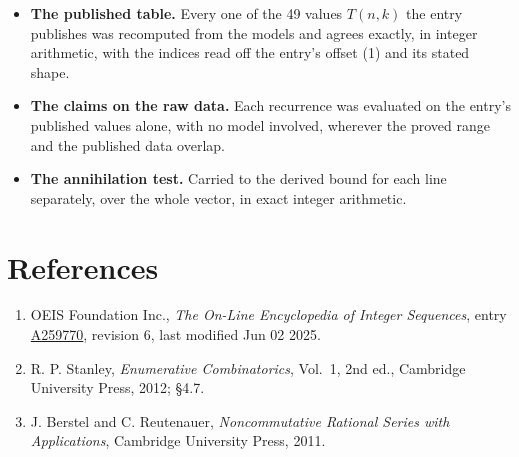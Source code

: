 \documentclass[11pt]{article}
\theoremstyle{definition}
\begin{document}
\begin{itemize}

\item {\bfseries The published table.} Every one of the 49 values $T(n,k)$ the entry publishes was recomputed from the models and agrees exactly, in integer arithmetic, with the indices read off the entry's offset (1) and its stated shape.

\item {\bfseries The claims on the raw data.} Each recurrence was evaluated on the entry's published values alone, with no model involved, wherever the proved range and the published data overlap.

\item {\bfseries The annihilation test.} Carried to the derived bound for each line separately, over the whole vector, in exact integer arithmetic.

\end{itemize}

\section{References}

\begin{enumerate}

\item OEIS Foundation Inc., \emph{The On-Line Encyclopedia of Integer Sequences}, entry \href{https://oeis.org/A259770}{A259770}, revision 6, last modified Jun 02 2025.

\item R. P. Stanley, \emph{Enumerative Combinatorics}, Vol.~1, 2nd ed., Cambridge University Press, 2012; \S4.7.

\item J. Berstel and C. Reutenauer, \emph{Noncommutative Rational Series with Applications}, Cambridge University Press, 2011.

\end{enumerate}
\end{document}
